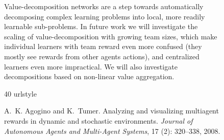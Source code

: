 \documentclass{article}
\begin{document}
\begin{figure}


Value-decomposition networks are a step towards automatically decomposing complex learning problems into local, more readily learnable sub-problems. In future work we will investigate the scaling of value-decomposition with growing team sizes, which make individual learners with team reward even more confused (they mostly see rewards from other agents actions), and centralized learners even more impractical. We will also investigate decompositions based on non-linear value aggregation.

\FloatBarrier

%
%

\begin{thebibliography}{40}
\providecommand{\natexlab}[1]{#1}
\providecommand{\url}[1]{\texttt{#1}}
\expandafter\ifx\csname urlstyle\endcsname\relax
  \providecommand{\doi}[1]{doi: #1}\else
  \providecommand{\doi}{doi: \begingroup \urlstyle{rm}\Url}\fi

A.~K. Agogino and K.~Tumer.
\newblock Analyzing and visualizing multiagent rewards in dynamic and
  stochastic environments.
\newblock \emph{Journal of Autonomous Agents and Multi-Agent Systems},
  17 (2): 320--338, 2008.


\end{thebibliography}
\end{figure}
\end{document}
